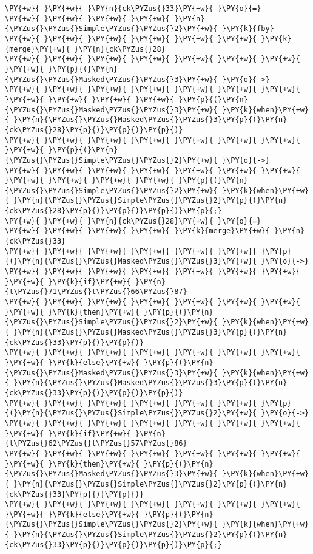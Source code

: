 \begin{Verbatim}[commandchars=\\\{\}]
\PY{+w}{ }\PY{+w}{ }\PY{n}{ck\PYZus{}33}\PY{+w}{ }\PY{o}{=}
\PY{+w}{ }\PY{+w}{ }\PY{+w}{ }\PY{+w}{ }\PY{n}{\PYZus{}\PYZus{}Simple\PYZus{}\PYZus{}2}\PY{+w}{ }\PY{k}{fby}
\PY{+w}{ }\PY{+w}{ }\PY{+w}{ }\PY{+w}{ }\PY{+w}{ }\PY{+w}{ }\PY{k}{merge}\PY{+w}{ }\PY{n}{ck\PYZus{}28}
\PY{+w}{ }\PY{+w}{ }\PY{+w}{ }\PY{+w}{ }\PY{+w}{ }\PY{+w}{ }\PY{+w}{ }\PY{+w}{ }\PY{p}{(}\PY{n}{\PYZus{}\PYZus{}Masked\PYZus{}\PYZus{}3}\PY{+w}{ }\PY{o}{->}
\PY{+w}{ }\PY{+w}{ }\PY{+w}{ }\PY{+w}{ }\PY{+w}{ }\PY{+w}{ }\PY{+w}{ }\PY{+w}{ }\PY{+w}{ }\PY{+w}{ }\PY{+w}{ }\PY{p}{(}\PY{n}{\PYZus{}\PYZus{}Masked\PYZus{}\PYZus{}3}\PY{+w}{ }\PY{k}{when}\PY{+w}{ }\PY{n}{\PYZus{}\PYZus{}Masked\PYZus{}\PYZus{}3}\PY{p}{(}\PY{n}{ck\PYZus{}28}\PY{p}{)}\PY{p}{)}\PY{p}{)}
\PY{+w}{ }\PY{+w}{ }\PY{+w}{ }\PY{+w}{ }\PY{+w}{ }\PY{+w}{ }\PY{+w}{ }\PY{+w}{ }\PY{p}{(}\PY{n}{\PYZus{}\PYZus{}Simple\PYZus{}\PYZus{}2}\PY{+w}{ }\PY{o}{->}
\PY{+w}{ }\PY{+w}{ }\PY{+w}{ }\PY{+w}{ }\PY{+w}{ }\PY{+w}{ }\PY{+w}{ }\PY{+w}{ }\PY{+w}{ }\PY{+w}{ }\PY{+w}{ }\PY{p}{(}\PY{n}{\PYZus{}\PYZus{}Simple\PYZus{}\PYZus{}2}\PY{+w}{ }\PY{k}{when}\PY{+w}{ }\PY{n}{\PYZus{}\PYZus{}Simple\PYZus{}\PYZus{}2}\PY{p}{(}\PY{n}{ck\PYZus{}28}\PY{p}{)}\PY{p}{)}\PY{p}{)}\PY{p}{;}
\PY{+w}{ }\PY{+w}{ }\PY{n}{ck\PYZus{}28}\PY{+w}{ }\PY{o}{=}
\PY{+w}{ }\PY{+w}{ }\PY{+w}{ }\PY{+w}{ }\PY{k}{merge}\PY{+w}{ }\PY{n}{ck\PYZus{}33}
\PY{+w}{ }\PY{+w}{ }\PY{+w}{ }\PY{+w}{ }\PY{+w}{ }\PY{+w}{ }\PY{p}{(}\PY{n}{\PYZus{}\PYZus{}Masked\PYZus{}\PYZus{}3}\PY{+w}{ }\PY{o}{->}
\PY{+w}{ }\PY{+w}{ }\PY{+w}{ }\PY{+w}{ }\PY{+w}{ }\PY{+w}{ }\PY{+w}{ }\PY{+w}{ }\PY{k}{if}\PY{+w}{ }\PY{n}{t\PYZus{}71\PYZus{}t\PYZus{}66\PYZus{}87}
\PY{+w}{ }\PY{+w}{ }\PY{+w}{ }\PY{+w}{ }\PY{+w}{ }\PY{+w}{ }\PY{+w}{ }\PY{+w}{ }\PY{k}{then}\PY{+w}{ }\PY{p}{(}\PY{n}{\PYZus{}\PYZus{}Simple\PYZus{}\PYZus{}2}\PY{+w}{ }\PY{k}{when}\PY{+w}{ }\PY{n}{\PYZus{}\PYZus{}Masked\PYZus{}\PYZus{}3}\PY{p}{(}\PY{n}{ck\PYZus{}33}\PY{p}{)}\PY{p}{)}
\PY{+w}{ }\PY{+w}{ }\PY{+w}{ }\PY{+w}{ }\PY{+w}{ }\PY{+w}{ }\PY{+w}{ }\PY{+w}{ }\PY{k}{else}\PY{+w}{ }\PY{p}{(}\PY{n}{\PYZus{}\PYZus{}Masked\PYZus{}\PYZus{}3}\PY{+w}{ }\PY{k}{when}\PY{+w}{ }\PY{n}{\PYZus{}\PYZus{}Masked\PYZus{}\PYZus{}3}\PY{p}{(}\PY{n}{ck\PYZus{}33}\PY{p}{)}\PY{p}{)}\PY{p}{)}
\PY{+w}{ }\PY{+w}{ }\PY{+w}{ }\PY{+w}{ }\PY{+w}{ }\PY{+w}{ }\PY{p}{(}\PY{n}{\PYZus{}\PYZus{}Simple\PYZus{}\PYZus{}2}\PY{+w}{ }\PY{o}{->}
\PY{+w}{ }\PY{+w}{ }\PY{+w}{ }\PY{+w}{ }\PY{+w}{ }\PY{+w}{ }\PY{+w}{ }\PY{+w}{ }\PY{k}{if}\PY{+w}{ }\PY{n}{t\PYZus{}62\PYZus{}t\PYZus{}57\PYZus{}86}
\PY{+w}{ }\PY{+w}{ }\PY{+w}{ }\PY{+w}{ }\PY{+w}{ }\PY{+w}{ }\PY{+w}{ }\PY{+w}{ }\PY{k}{then}\PY{+w}{ }\PY{p}{(}\PY{n}{\PYZus{}\PYZus{}Masked\PYZus{}\PYZus{}3}\PY{+w}{ }\PY{k}{when}\PY{+w}{ }\PY{n}{\PYZus{}\PYZus{}Simple\PYZus{}\PYZus{}2}\PY{p}{(}\PY{n}{ck\PYZus{}33}\PY{p}{)}\PY{p}{)}
\PY{+w}{ }\PY{+w}{ }\PY{+w}{ }\PY{+w}{ }\PY{+w}{ }\PY{+w}{ }\PY{+w}{ }\PY{+w}{ }\PY{k}{else}\PY{+w}{ }\PY{p}{(}\PY{n}{\PYZus{}\PYZus{}Simple\PYZus{}\PYZus{}2}\PY{+w}{ }\PY{k}{when}\PY{+w}{ }\PY{n}{\PYZus{}\PYZus{}Simple\PYZus{}\PYZus{}2}\PY{p}{(}\PY{n}{ck\PYZus{}33}\PY{p}{)}\PY{p}{)}\PY{p}{)}\PY{p}{;}
\end{Verbatim}
